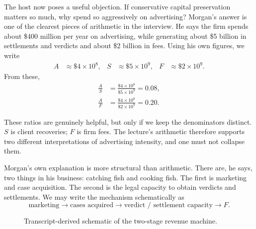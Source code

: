 The host now poses a useful objection. If conservative capital preservation matters so much, why spend so aggressively on advertising? Morgan's answer is one of the clearest pieces of arithmetic in the interview. He says the firm spends about \$400 million per year on advertising, while generating about \$5 billion in settlements and verdicts and about \$2 billion in fees. Using his own figures, we write
\begin{align}
A &\approx \$4 \times 10^8, &
S &\approx \$5 \times 10^9, &
F &\approx \$2 \times 10^9.
\end{align}
From these,
\begin{align}
\frac{A}{S}
&=
\frac{\$4 \times 10^8}{\$5 \times 10^9}
=
0.08,\\[4pt]
\frac{A}{F}
&=
\frac{\$4 \times 10^8}{\$2 \times 10^9}
=
0.20.
\end{align}

These ratios are genuinely helpful, but only if we keep the denominators distinct. \(S\) is client recoveries; \(F\) is firm fees. The lecture's arithmetic therefore supports two different interpretations of advertising intensity, and one must not collapse them.

Morgan's own explanation is more structural than arithmetic. There are, he says, two things in his business: catching fish and cooking fish. The first is marketing and case acquisition. The second is the legal capacity to obtain verdicts and settlements. We may write the mechanism schematically as
\begin{equation}
\text{marketing} \to \text{cases acquired} \to \text{verdict / settlement capacity} \to F.
\end{equation}

\begin{figure}
\centering
{}
\caption{Transcript-derived schematic of the two-stage revenue machine.}
\label{fig:fish-refined}
\end{figure}

